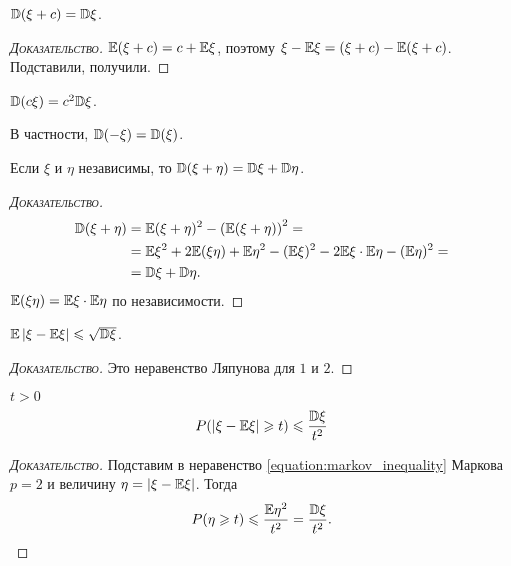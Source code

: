 \documentclass[../main.tex]{subfiles}
\begin{document}
\begin{prop}
 $ \mathbb D(\xi + c) = \mathbb D\xi $.
\end{prop}
\begin{proof}[\normalfont\textsc{Доказательство}]
 $ \mathbb E(\xi + c) = c + \mathbb E\xi $, поэтому $ \xi - \mathbb E\xi = (\xi + c) - \mathbb E(\xi + c) $. Подставили, получили.
\end{proof}
\begin{prop}
 $ \mathbb D(c\xi) = c^{2}\mathbb D\xi $.

 В частности, $ \mathbb D(-\xi) = \mathbb D(\xi) $.
\end{prop}
\begin{prop}
 Если $ \xi  $ и $ \eta $ независимы, то $ \mathbb D(\xi + \eta) = \mathbb D\xi + \mathbb D\eta $.
\end{prop}
\begin{proof}[\normalfont\textsc{Доказательство}]
 \begin{align*}
  \mathbb D(\xi + \eta) &= \mathbb E(\xi + \eta)^{2} - \left( \mathbb E(\xi+\eta) \right)^{2} = \\
  &= \mathbb E\xi^{2} + 2\mathbb E(\xi\eta) + \mathbb E\eta^{2} -  (\mathbb E\xi)^{2} - 2\mathbb E\xi \cdot \mathbb E\eta - (\mathbb E\eta)^{2} = \\
  &=\mathbb D\xi+\mathbb D\eta.
 \end{align*} $ \mathbb E(\xi\eta) = \mathbb E\xi \cdot \mathbb E\eta $ по независимости.
\end{proof}

\begin{prop}
 $ \mathbb E \left| \xi - \mathbb E\xi \right| \leqslant \sqrt{\mathbb D\xi} $.
\end{prop}
\begin{proof}[\normalfont\textsc{Доказательство}]
 Это неравенство Ляпунова для $ 1 $ и $ 2 $.
\end{proof}

\begin{prop}
 \label{proposition:chebyshev_inequality}
 $ t > 0 $
 \begin{align}
  \label{equation:chebyshev_inequality}
  P(\left| \xi - \mathbb E\xi \right| \geqslant t) \leqslant \frac{\mathbb D\xi}{t^{2}}
 \end{align} 
\end{prop}
\begin{proof}[\normalfont\textsc{Доказательство}]
 Подставим в неравенство \eqref{equation:markov_inequality} Маркова $ p=2 $ и величину $ \eta = \left| \xi - \mathbb E\xi \right| $. Тогда
 \begin{align*}
  P(\eta \geqslant t) \leqslant \frac{\mathbb E\eta^{2}}{t^{2}} = \frac{\mathbb D\xi}{t^{2}}.
 \end{align*} 
\end{proof}
\end{document}
